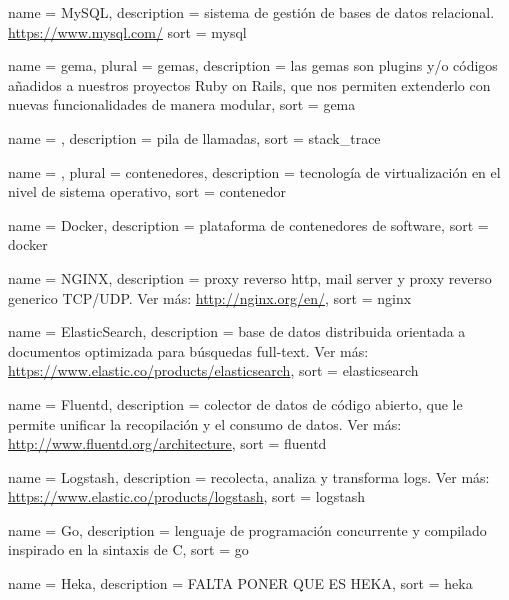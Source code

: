  {
  name        = {MySQL},
  description =
    {sistema de gestión de bases de datos relacional.
    \url{https://www.mysql.com/}}
  sort        = {mysql}
}

 {
  name        = {gema},
  plural      = {gemas},
  description =
    {las gemas son plugins y/o códigos añadidos a nuestros proyectos Ruby on
    Rails, que nos permiten extenderlo con nuevas funcionalidades de manera
    modular},
  sort        = {gema}
}

 {
  name        = {},
  description = {pila de llamadas},
  sort        = {stack_trace}
}

 {
  name        = {},
  plural      = {contenedores},
  description = {tecnología de virtualización en el nivel de sistema operativo},
  sort        = {contenedor}
}

 {
  name        = {Docker},
  description = {plataforma de contenedores de software},
  sort        = {docker}
}

 {
  name        = {NGINX},
  description =
    {proxy reverso http, mail server y proxy reverso generico TCP/UDP.
    Ver más: \url{http://nginx.org/en/}},
  sort        = {nginx}
}

 {
  name        = {ElasticSearch},
  description =
    {base de datos distribuida orientada a documentos optimizada para búsquedas
    full-text. Ver más: \url{https://www.elastic.co/products/elasticsearch}},
  sort        = {elasticsearch}
}

 {
  name        = {Fluentd},
  description =
    {colector de datos de código abierto, que le permite unificar
    la recopilación y el consumo de datos. Ver más:
    \url{http://www.fluentd.org/architecture}},
  sort        = {fluentd}
}

 {
  name        = {Logstash},
  description = 
    {recolecta, analiza y transforma logs. Ver más:
    \url{https://www.elastic.co/products/logstash}},
  sort        = {logstash}
}

 {
  name        = {Go},
  description = 
    {lenguaje de programación concurrente y compilado inspirado en la sintaxis
    de C},
  sort        = {go}
}

 {
  name        = {Heka},
  description = {FALTA PONER QUE ES HEKA},
  sort        = {heka}
}


